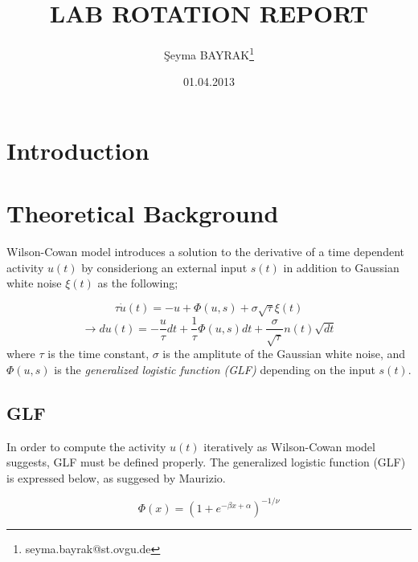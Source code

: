 \documentclass[twocolumn]{article}
\begin{document}
\title{LAB ROTATION REPORT \\ }
\date{01.04.2013}
\author[1]{\c{S}eyma BAYRAK\thanks{seyma.bayrak@st.ovgu.de}}
\maketitle
\newpage

\twocolumn[
\begin{@twocolumnfalse}
\begin{abstract}

ABSC
\\ 

\end{abstract}

\end{@twocolumnfalse}  ]
 

 \section{Introduction}


 \section{Theoretical Background}
Wilson-Cowan model introduces a solution to the derivative of a time dependent activity $u(t)$ by consideriong an external input $s(t)$ in addition to Gaussian white noise $\xi(t)$ as the following;

\begin{equation}
 \tau\dot{u}(t)=-u+\Phi(u,s)+\sigma\sqrt{\tau}\xi(t)
\end{equation}
\begin{equation*}
\rightarrow du(t)=-\frac{u}{\tau}dt+\frac{1}{\tau}\Phi(u,s)dt+\frac{\sigma}{\sqrt{\tau}}n(t)\sqrt{dt} 
\end{equation*}
where $\tau$ is the time constant, $\sigma$ is the amplitute of the Gaussian white noise, and $\Phi(u,s)$ is the \textit{generalized logistic function (GLF)} depending on the input $s(t)$.

\subsection{GLF}
In order to compute the activity $u(t)$ iteratively as Wilson-Cowan model suggests, GLF must be defined properly. The generalized logistic function (GLF) is expressed below, as suggesed by Maurizio. 

\begin{equation}
 \Phi(x)=(1+e^{-\beta x+\alpha})^{-1/\nu}
\end{equation}
\end{document}
